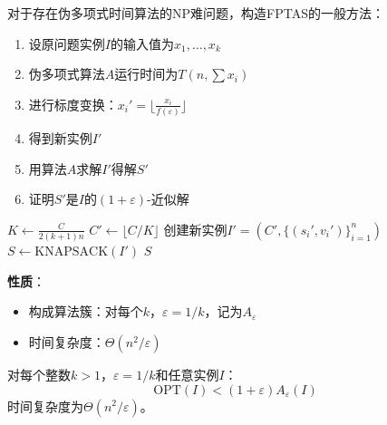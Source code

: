 \documentclass[./../main.tex]{subfiles} %
\begin{document}
对于存在伪多项式时间算法的NP难问题，构造FPTAS的一般方法：
\begin{enumerate}
    \item 设原问题实例$I$的输入值为$x_1,\ldots,x_k$
    \item 伪多项式算法$A$运行时间为$T(n,\sum x_i)$
    \item 进行标度变换：$x_i' = \lfloor \frac{x_i}{f(\varepsilon)} \rfloor$
    \item 得到新实例$I'$
    \item 用算法$A$求解$I'$得解$S'$
    \item 证明$S'$是$I$的$(1+\varepsilon)$-近似解
\end{enumerate}

\begin{algorithm}[H]
\caption{FPTAS for 0-1 Knapsack}
\SetAlgoLined
{}

$K \leftarrow \frac{C}{2(k+1)n}$ \;
$C' \leftarrow \lfloor C/K \rfloor$ \;
创建新实例$I' = (C',\{(s_i',v_i')\}_{i=1}^n)$\;
$S \leftarrow \text{KNAPSACK}(I')$ \;
\Return $S$
\end{algorithm}

\textbf{性质}：
\begin{itemize}
    \item 构成算法簇：对每个$k$，$\varepsilon = 1/k$，记为$A_\varepsilon$
    \item 时间复杂度：$\Theta(n^2/\varepsilon)$
\end{itemize}

\begin{theorem}
对每个整数$k>1$，$\varepsilon=1/k$和任意实例$I$：
$$ \text{OPT}(I) < (1+\varepsilon)A_{\varepsilon}(I) $$
时间复杂度为$\Theta(n^2/\varepsilon)$。
\end{theorem}
\end{document}
